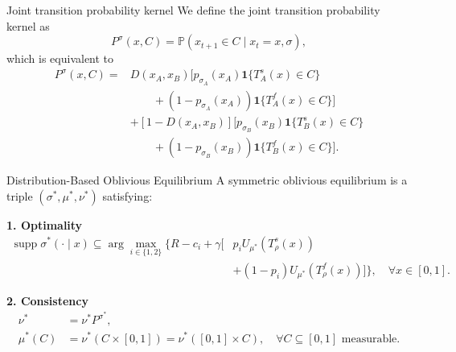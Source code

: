 \documentclass[10pt]{beamer}
\begin{document}
\begin{frame}{Joint transition probability kernel}
    We define the joint transition probability kernel as
    \[
        P^\sigma(x,C)=\mathbb{P}(x_{t+1}\in C\mid x_t=x,\sigma),
    \]
    which is equivalent to
    \begin{equation}
        \begin{aligned}
            P^\sigma(x,C)
            ={}&D(x_A,x_B)\Big[
                p_{\sigma_A}(x_A)\mathbf{1}\{T_A^s(x)\in C\}\\
            &\qquad +(1-p_{\sigma_A}(x_A))\mathbf{1}\{T_A^f(x)\in C\}\Big]\\
            &+[1-D(x_A,x_B)]\Big[
                p_{\sigma_B}(x_B)\mathbf{1}\{T_B^s(x)\in C\}\\
            &\qquad +(1-p_{\sigma_B}(x_B))\mathbf{1}\{T_B^f(x)\in C\}\Big].
        \end{aligned}
    \end{equation}
\end{frame}

\begin{frame}{Distribution-Based Oblivious Equilibrium}
    A symmetric oblivious equilibrium is a triple
    $(\sigma^*,\mu^*,\nu^*)$ satisfying:

    \medskip
    \textbf{1. Optimality}
        \begin{equation*}
            \begin{aligned}
            \operatorname{supp}\sigma^*(\cdot\mid x)
            \subseteq
            \arg\max_{i\in\{1,2\}}
            \Big\{
            R-c_i+\gamma\big[
            &p_iU_{\mu^*}(T_\rho^s(x))\\
            &+(1-p_i)U_{\mu^*}(T_\rho^f(x))
            \big]
            \Big\},
            \quad \forall x\in[0,1].
            \end{aligned}
        \end{equation*}

    \medskip
    \textbf{2. Consistency}
        \begin{equation*}
            \begin{aligned}
            \nu^*&=\nu^*P^{\sigma^*},\\
            \mu^*(C)&=\nu^*(C\times[0,1])
            =\nu^*([0,1]\times C),
            \quad \forall C\subseteq[0,1]\text{ measurable}.
            \end{aligned}
        \end{equation*}
\end{frame}
\end{document}
